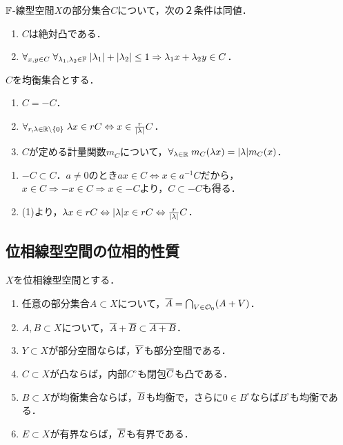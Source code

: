 \documentclass[uplatex,dvipdfmx]{jsreport}
\begin{document}
\begin{lemma}[絶対凸性の特徴付け]
    $\mathbb{F}$-線型空間$X$の部分集合$C$について，次の２条件は同値．
    \begin{enumerate}
        \item $C$は絶対凸である．
        \item $\forall_{x,y\in C}\;\forall_{\lambda_1,\lambda_2\in\mathbb{F}}\;\lvert\lambda_1\rvert+\lvert\lambda_2\rvert\le 1\Rightarrow \lambda_1x+\lambda_2y\in C$．
    \end{enumerate}
\end{lemma}

\begin{lemma}[均衡性]
    $C$を均衡集合とする．
    \begin{enumerate}
        \item $C=-C$．
        \item $\forall_{r,\lambda\in\mathbb{R}\setminus\{0\}}\;\lambda x\in rC\Leftrightarrow x\in\frac{r}{\lvert\lambda\rvert}C$．
        \item $C$が定める計量関数$m_C$について，$\forall_{\lambda\in\mathbb{R}}\;m_C(\lambda x)=\lvert\lambda\rvert m_C(x)$．
    \end{enumerate}
\end{lemma}
\begin{Proof}\mbox{}
    \begin{enumerate}
        \item $-C\subset C$．$a\ne0$のとき$ax\in C\Leftrightarrow x\in a^{-1}C$だから，$x\in C\Rightarrow -x\in C\Rightarrow x\in -C$より，$C\subset-C$も得る．
        \item (1)より，$\lambda x\in rC\Leftrightarrow\lvert\lambda\rvert x\in rC\Leftrightarrow\frac{r}{\lvert\lambda\rvert}C$．
    \end{enumerate}
\end{Proof}

\subsection{位相線型空間の位相的性質}

\begin{theorem}
    $X$を位相線型空間とする．
    \begin{enumerate}
        \item 任意の部分集合$A\subset X$について，$\overline{A}=\bigcap_{V\in\mathcal{O}_0}(A+V)$．
        \item $A,B\subset X$について，$\overline{A}+\overline{B}\subset\overline{A+B}$．
        \item $Y\subset X$が部分空間ならば，$\overline{Y}$も部分空間である．
        \item $C\subset X$が凸ならば，内部$C^\circ$も閉包$\overline{C}$も凸である．
        \item $B\subset X$が均衡集合ならば，$\overline{B}$も均衡で，さらに$0\in B^\circ$ならば$B^\circ$も均衡である．
        \item $E\subset X$が有界ならば，$\overline{E}$も有界である．
    \end{enumerate}
\end{theorem}
\end{document}
